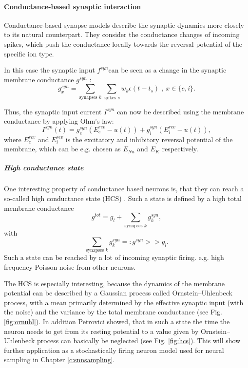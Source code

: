 \paragraph{Conductance-based synaptic interaction} \label{c:coba}
Conductance-based synapse models describe the synaptic dynamics more closely to its natural counterpart. They consider the conductance changes of incoming spikes, which push the conductance locally towards the reversal potential of the specific ion type. 

In this case the synaptic input $f^{syn} $can be seen as a change in the synaptic membrane conductance $g^{syn}$ :
\[
g_x^{syn} = \sum_{\text{synapses } k } \sum_{\text{spikes } s} w_k \epsilon(t - t_s) \text{ ,      } x \in \{e, i\}.
\]

Thus, the synaptic input current $I^{syn}$ can now be described using the membrane conductance by applying Ohm's law:
\[
I^{syn}(t) = g_e^{syn} (E_e^{rev} - u(t)) + g_i^{syn} (E_i^{rev} - u(t)),
\]
where $E_e^{rev}$ and $E_i^{rev}$ is the excitatory and inhibitory reversal potential of the membrane, which can be e.g. chosen as $E_{Na}$ and $E_{K}$ respectively.  

\subparagraph{High conductance state} \label{c:hcs}
One interesting property of conductance based neurons is, that they can reach a so-called high conductance state (HCS) \cite{Petrovici2016}. Such a state is defined by a high total membrane conductance 
\[
g^{tot} = g_l + \sum_{\text{synapses } k} g_k^{syn},
\]
with 
\[
\sum_{\text{synapses } k} g_k^{syn} =: g^{syn} >> g_l .
\]
Such a state can be reached by a lot of incoming synaptic firing. e.g. high frequency Poisson noise from other neurons. 

The HCS is especially interesting, because the dynamics of the membrane potential can be described by a Gaussian process called Ornstein–Uhlenbeck process, with a mean primarily determined by the effective synaptic input (with the noise) and the variance by the total membrane conductance (see Fig. \ref{fig:ornuhl}).
In addition Petrovici showed, that in such a state the time the neuron needs to get from its resting potential to a value given by Ornstein–Uhlenbeck process can basically be neglected (see Fig. \ref{fig:hcs}).
This will show further application as a stochastically firing neuron model used for neural sampling  in Chapter \ref{c:snnsampling}.

